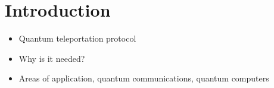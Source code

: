 \section{Introduction}
\begin{itemize}
    \item Quantum teleportation protocol
    \item Why is it needed?
    \item Areas of application, quantum communications, quantum computers
\end{itemize}